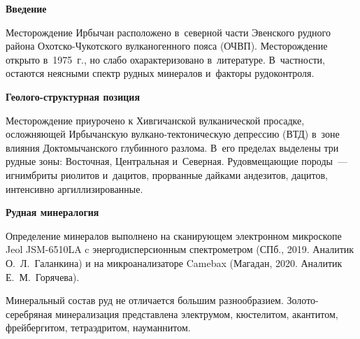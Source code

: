  



\makeProcTitleNewLine

\textbf{Введение}

Месторождение Ирбычан расположено в~северной части Эвенского рудного района Охотско-Чукотского вулканогенного пояса (ОЧВП). Месторождение открыто в~1975~г., но слабо охарактеризовано в~литературе. В~частности, остаются неясными спектр рудных минералов и~факторы рудоконтроля.

\textbf{Геолого-структурная позиция}

Месторождение приурочено к Хивгичанской вулканической просадке, осложняющей Ирбычанскую вулкано-тектоническую депрессию (ВТД) в~зо\-не влияния Доктомычанского глубинного разлома. В~его пределах выделены три рудные зоны: Восточная, Центральная и~Северная. Рудовмещающие породы~--- игнимбриты риолитов и~дацитов, прорванные дайками андезитов, дацитов, интенсивно аргиллизированные.

\textbf{Рудная минералогия}

Определение минералов выполнено на сканирующем электронном микроскопе Jeol JSM-6510LA c энергодисперсионным спектрометром (СПб., 2019. Аналитик О.~Л.~Галанкина) и на микроанализаторе Camebax (Магадан, 2020. Аналитик Е.~М.~Горячева).

Минеральный состав руд не отличается большим разнообразием. Золото-серебряная минерализация представлена электрумом, кюстелитом, акантитом, фрейбергитом, тетраэдритом, науманнитом.

